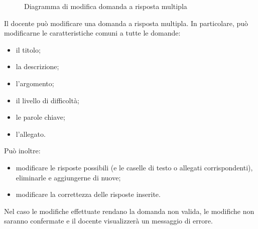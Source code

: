 \documentclass[a4paper, titlepage]{article}
\begin{document}
\newpage
{}
\begin{figure}[H]
	\centering
	\noindent{}
	\caption{Diagramma di modifica domanda a risposta multipla}
\end{figure}
Il docente può modificare una domanda a risposta multipla. In particolare, può modificarne le caratteristiche comuni a tutte le domande:
\begin{itemize}
	\item il titolo;
	\item la descrizione;
	\item l’argomento;
	\item il livello di difficoltà;
	\item le parole chiave;
	\item l’allegato.
\end{itemize}
Può inoltre:
\begin{itemize}
	\item modificare le risposte possibili (e le caselle di testo o allegati corrispondenti), eliminarle e aggiungerne di nuove;
	\item modificare la correttezza delle risposte inserite.
\end{itemize}
Nel caso le modifiche effettuate rendano la domanda non valida, le modifiche non saranno confermate e il docente visualizzerà un messaggio di errore.

\newpage
\end{document}
